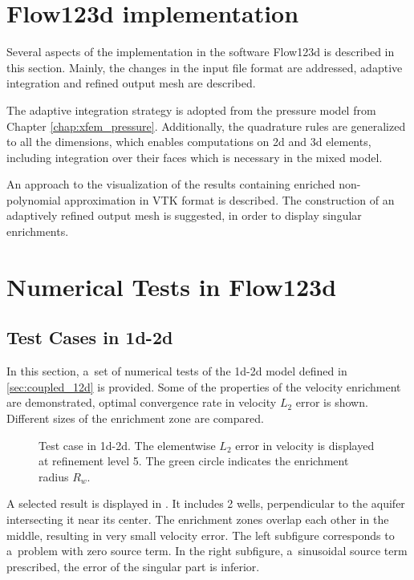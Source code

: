 
\section{Flow123d implementation}
Several aspects of the implementation in the software Flow123d is described in this section.
Mainly, the changes in the input file format are addressed,
adaptive integration and refined output mesh are described.

The adaptive integration strategy is adopted from the pressure model from Chapter \ref{chap:xfem_pressure}.
Additionally, the quadrature rules are generalized to all the dimensions, which enables
computations on 2d and 3d elements, including integration over their faces which is necessary in the mixed model.

An approach to the visualization of the results containing enriched non-polynomial approximation  in VTK format is described.
The construction of an adaptively refined output mesh is suggested, in order to display singular enrichments.


\section{Numerical Tests in Flow123d}
\subsection{Test Cases in 1d-2d} \label{sec:num_test_cases_1d2d}
In this section, a~set of numerical tests of the 1d-2d model defined in \ref{sec:coupled_12d} is provided.
Some of the properties of the velocity enrichment are demonstrated, optimal convergence rate in velocity $L_2$ error
is shown. Different sizes of the enrichment zone are compared.

\begin{figure}[!htb]
    \centering
    \caption[Error distribution in 1d-2d.]
    {Test case in 1d-2d. The elementwise $L_2$ error in velocity is displayed at refinement level 5.
    The green circle indicates the enrichment radius $R_w$. }
    \label{fig:mh_tc2_error}
\end{figure}
A selected result is displayed in .
It includes 2 wells, perpendicular to the aquifer intersecting it near its center.
The enrichment zones overlap each other in the middle, resulting in very small velocity error.
The left subfigure corresponds to a~problem with zero source term. In the right subfigure,
a~sinusoidal source term prescribed, the error of the singular part is inferior.

